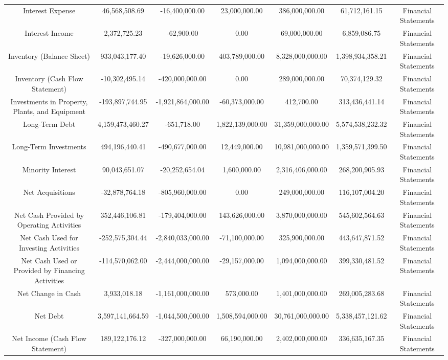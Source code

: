 \begin{longtable}{ccccccc}
Interest Expense & 46,568,508.69 & -16,400,000.00 & 23,000,000.00 & 386,000,000.00 & 61,712,161.15 & Financial Statements \\
Interest Income & 2,372,725.23 & -62,900.00 & 0.00 & 69,000,000.00 & 6,859,086.75 & Financial Statements \\
Inventory (Balance Sheet) & 933,043,177.40 & -19,626,000.00 & 403,789,000.00 & 8,328,000,000.00 & 1,398,934,358.21 & Financial Statements \\
Inventory (Cash Flow Statement) & -10,302,495.14 & -420,000,000.00 & 0.00 & 289,000,000.00 & 70,374,129.32 & Financial Statements \\
Investments in Property, Plants, and Equipment & -193,897,744.95 & -1,921,864,000.00 & -60,373,000.00 & 412,700.00 & 313,436,441.14 & Financial Statements \\
Long-Term Debt & 4,159,473,460.27 & -651,718.00 & 1,822,139,000.00 & 31,359,000,000.00 & 5,574,538,232.32 & Financial Statements \\
Long-Term Investments & 494,196,440.41 & -490,677,000.00 & 12,449,000.00 & 10,981,000,000.00 & 1,359,571,399.50 & Financial Statements \\
Minority Interest & 90,043,651.07 & -20,252,654.04 & 1,600,000.00 & 2,316,406,000.00 & 268,200,905.93 & Financial Statements \\
Net Acquisitions & -32,878,764.18 & -805,960,000.00 & 0.00 & 249,000,000.00 & 116,107,004.20 & Financial Statements \\
Net Cash Provided by Operating Activities & 352,446,106.81 & -179,404,000.00 & 143,626,000.00 & 3,870,000,000.00 & 545,602,564.63 & Financial Statements \\
Net Cash Used for Investing Activities & -252,575,304.44 & -2,840,033,000.00 & -71,100,000.00 & 325,900,000.00 & 443,647,871.52 & Financial Statements \\
Net Cash Used or Provided by Financing Activities & -114,570,062.00 & -2,444,000,000.00 & -29,157,000.00 & 1,094,000,000.00 & 399,330,481.52 & Financial Statements \\
Net Change in Cash & 3,933,018.18 & -1,161,000,000.00 & 573,000.00 & 1,401,000,000.00 & 269,005,283.68 & Financial Statements \\
Net Debt & 3,597,141,664.59 & -1,044,500,000.00 & 1,508,594,000.00 & 30,761,000,000.00 & 5,338,457,121.62 & Financial Statements \\
Net Income (Cash Flow Statement) & 189,122,176.12 & -327,000,000.00 & 66,190,000.00 & 2,402,000,000.00 & 336,635,167.35 & Financial Statements \\

\end{longtable}
